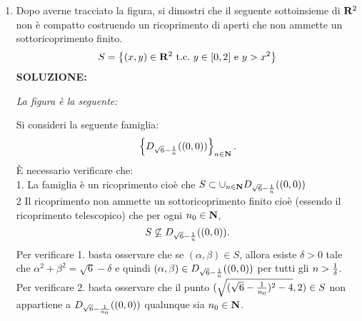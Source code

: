 \documentclass[12pt,a4paper]{report}\pagenumbering{roman}
\begin{document}
\begin{enumerate}
{\centerline{}


Quindi\\
${\bf Dom}(f)^0=\left\{(x,y)\in{\bf R}^2\ \mbox{t.c.}\ y>-2-x^2\right\}$,\\
$\overline{{\bf Dom}(f)}={\bf Dom}(f),$\\
$\partial({\bf Dom}(f))\left\{(x,y)\in{\bf R}^2\ \mbox{t.c.}\ y=-2-x^2\right\}$ e\\
$D({\bf Dom}(f))={\bf Dom}(f)$.}\\
(b) {\it Il dominio della funzione si ottiene risolvendo la disequazione
$y+2-x^2\geq0$ (l'esponenziale, in quanto sempre positivo \`e ininfluente ai fini
dell'esistenza della funzione). Il grafico:
\medskip

\centerline{}


Quindi\\
${\bf Dom}(f)^0=\left\{(x,y)\in{\bf R}^2\ \mbox{t.c.}\ y>-2+x^2\right\}$,\\
$\overline{{\bf Dom}(f)}={\bf Dom}(f),$\\
$\partial({\bf Dom}(f))\left\{(x,y)\in{\bf R}^2\ \mbox{t.c.}\ y=-2+x^2\right\}$ e\\
$D({\bf Dom}(f))={\bf Dom}(f)$.}

\item Dopo averne tracciato la figura, si dimostri che il seguente sottoinsieme
di ${\bf R}^2$ non \`e compatto costruendo un ricoprimento di aperti che non
ammette un sottoricoprimento finito.
$$S=\left\{(x,y)\in{\bf R}^2\ \mbox{t.c.}\ y\in[0,2]\ \mbox{e}\ y>x^2\right\}$$
{\bf SOLUZIONE:} {\it La figura \`e la seguente:\medskip

\centerline{}

Si consideri la seguente famiglia: 
$$\left\{D_{\sqrt{6}-{1\over n}}((0,0))\right\}_{n\in{\bf N}}.$$
\`E necessario verificare che:\\
1. La famiglia \`e un ricoprimento cio\`e che 
$S\subset\cup_{n\in{\bf N}}D_{\sqrt{6}-{1\over n}}((0,0))$\\
2 Il ricoprimento non ammette un sottoricoprimento finito cio\`e 
(essendo il ricoprimento telescopico) che per ogni $n_0\in{\bf N}$, 
$$S\not\subseteq D_{\sqrt{6}-{1\over n}}((0,0)).$$
Per verificare 1. basta osservare che se $(\alpha,\beta)\in S$, allora esiste $\delta>0$ 
tale che $\alpha^2+\beta^2=\sqrt{6}-\delta$ e quindi $(\alpha,\beta)\in 
D_{\sqrt{6}-{1\over n}}((0,0))$ per tutti gli $n>{1\over \delta}$. \\
Per verificare 2. basta osservare che il punto $(\sqrt{(\sqrt{6}-{1\over n_0})^2-4},2)\in S$ non appartiene a 
$D_{\sqrt{6}-{1\over n_0}}((0,0))$ qualunque sia $n_0\in{\bf N}$.}


\end{enumerate}
\end{document}
